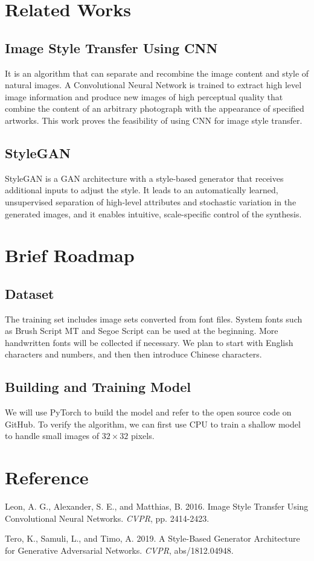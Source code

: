 \documentclass[letterpaper]{article}
\begin{document}
\section{Related Works}
\subsection{Image Style Transfer Using CNN}
It is an algorithm that can separate and recombine the image content and style of natural images. A Convolutional Neural Network is trained to extract high level image information and produce new images of high perceptual quality that combine the content of an arbitrary photograph with the appearance of specified artworks. This work proves the feasibility of using CNN for image style transfer.
\subsection{StyleGAN}
StyleGAN is a GAN architecture with a style-based generator that receives additional inputs to adjust the style. It leads to an automatically learned, unsupervised separation of high-level attributes and stochastic variation in the generated images, and it enables intuitive, scale-specific control of the synthesis.

\section{Brief Roadmap}
\subsection{Dataset}
The training set includes image sets converted from font files. System fonts such as Brush Script MT and Segoe Script can be used at the beginning. More handwritten fonts will be collected if necessary. We plan to start with English characters and numbers, and then then introduce Chinese characters.
\subsection{Building and Training Model}
We will use PyTorch to build the model and refer to the open source code on GitHub. To verify the algorithm, we can first use CPU to train a shallow model to handle small images of $32 \times 32$ pixels.

\section{Reference}
\smallskip \noindent
Leon, A. G., Alexander, S. E., and Matthias, B. 2016. Image Style Transfer Using Convolutional Neural Networks. \textit{CVPR}, pp. 2414-2423.

\smallskip \noindent
Tero, K., Samuli, L., and Timo, A. 2019. A Style-Based Generator Architecture for Generative Adversarial Networks. \textit{CVPR}, abs/1812.04948.



\end{document}
